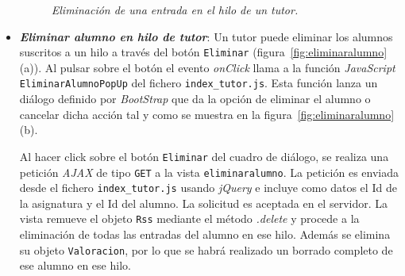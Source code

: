 \documentclass[a4paper, 12pt]{book}
\begin{document}
\begin{itemize}
  \begin{figure}
    \centering
    \caption{\textit{Eliminaci\'on de una entrada en el hilo de un tutor.}}
    \label{fig:eliminarentrada}
  \end{figure}

  
  \item {\bfseries \textit{Eliminar alumno en hilo de tutor}}: Un tutor puede eliminar los alumnos suscritos a un hilo a trav\'es del 
  bot\'on \texttt{Eliminar} (figura~\ref{fig:eliminaralumno}(a)). Al pulsar sobre el bot\'on el evento \textit{onClick} llama a la funci\'on 
  \textit{JavaScript} \texttt{EliminarAlumnoPopUp} del fichero \texttt{index\_tutor.js}. Esta funci\'on lanza un di\'alogo definido por \textit{BootStrap} 
  que da la opci\'on de eliminar el alumno o cancelar dicha acci\'on tal y como se muestra en la figura~\ref{fig:eliminaralumno}(b). 
  
  Al hacer click sobre el bot\'on \texttt{Eliminar} del cuadro de di\'alogo, se realiza una petici\'on \textit{AJAX} de tipo \texttt{GET} a la vista 
  \texttt{eliminaralumno}. La petici\'on es enviada desde el fichero \texttt{index\_tutor.js} usando \textit{jQuery} e incluye como datos el 
  Id de la asignatura y el Id del alumno. La solicitud es aceptada en el servidor. La vista remueve el objeto \texttt{Rss} mediante el m\'etodo 
  \textit{.delete} y procede a la eliminaci\'on de todas las entradas del alumno en ese hilo. Adem\'as se elimina su objeto \texttt{Valoracion},
  por lo que se habr\'a realizado un borrado completo de ese alumno en ese hilo.
  

\end{itemize}
\end{document}

